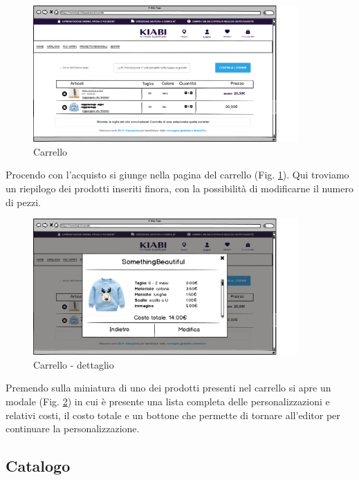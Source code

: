 \documentclass[12pt,italian,]{report}
\begin{document}
\begin{figure}[h]
\centering
\includegraphics[width=0.9\textwidth]{../balsamiq/balsamiq_finale/Carrello.png}
\caption{Carrello}
\label{carrello}
\end{figure}

Procendo con l'acquisto si giunge nella pagina del carrello (Fig. \ref{carrello}). Qui
troviamo un riepilogo dei prodotti inseriti finora, con la possibilità
di modificarne il numero di pezzi.


\begin{figure}[ht]
\centering
\includegraphics[width=0.9\textwidth]{../balsamiq/balsamiq_finale/Carrellodettagli.png}
\caption{Carrello - dettaglio}
\label{carr-dett}
\end{figure}

Premendo sulla miniatura di uno dei prodotti presenti nel carrello si
apre un modale (Fig. \ref{carr-dett}) in cui è presente una lista completa delle
personalizzazioni e relativi costi, il costo totale e un bottone che
permette di tornare all'editor per continuare la personalizzazione.



\newpage
\hypertarget{catalogo}{%
\subsection{Catalogo}\label{catalogo}}
\end{document}
